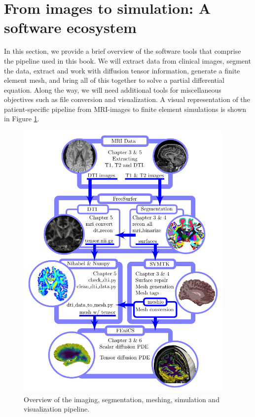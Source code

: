 \section{From images to simulation: A software ecosystem}

In this section, we provide a brief overview of the software tools that 
comprise the pipeline used in this book. We will extract data from clinical
images, segment the data, extract and work with diffusion tensor
information, generate a finite element mesh, and bring all of this
together to solve a partial differential equation. Along
the way, we will need additional tools for miscellaneous
objectives such as file conversion and visualization. A visual
representation of the patient-specific pipeline from MRI-images to
finite element simulations is shown in Figure
\ref{fig:chp2:imaging-pipeine-overview}.

\begin{figure}
\centering
 \includegraphics[width=0.95\textwidth]{./graphics/chp2/pipeline-overview.pdf} 
  \caption{Overview of the imaging, segmentation, meshing, simulation and visualization pipeline.}
  \label{fig:chp2:imaging-pipeine-overview}
\end{figure}


